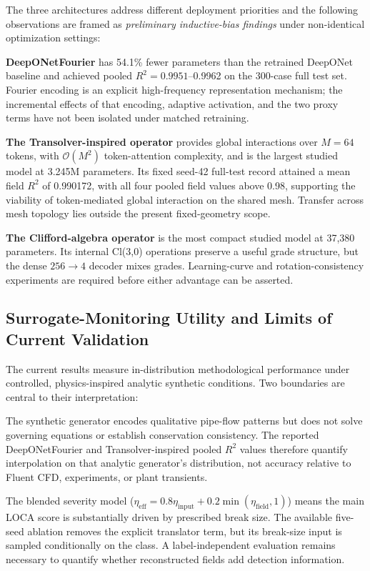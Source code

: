 \documentclass[journal]{IEEEtran}
\newcommand{\added}[1]{#1}
\begin{document}
The three architectures address different deployment priorities and the following observations are framed as \emph{preliminary inductive-bias findings} under non-identical optimization settings:

\added{\textbf{DeepONetFourier} has 54.1\% fewer parameters than the retrained DeepONet baseline and achieved pooled $R^2=0.9951$--0.9962 on the 300-case full test set. Fourier encoding is an explicit high-frequency representation mechanism; the incremental effects of that encoding, adaptive activation, and the two proxy terms have not been isolated under matched retraining.}

\added{\textbf{The Transolver-inspired operator} provides global interactions over $M=64$ tokens, with $\mathcal{O}(M^2)$ token-attention complexity, and is the largest studied model at 3.245M parameters. Its fixed seed-42 full-test record attained a mean field $R^2$ of 0.990172, with all four pooled field values above 0.98, supporting the viability of token-mediated global interaction on the shared mesh. Transfer across mesh topology lies outside the present fixed-geometry scope.}

\added{\textbf{The Clifford-algebra operator} is the most compact studied model at 37,380 parameters. Its internal Cl(3,0) operations preserve a useful grade structure, but the dense $256\to4$ decoder mixes grades. Learning-curve and rotation-consistency experiments are required before either advantage can be asserted.}

\subsection{Surrogate-Monitoring Utility and Limits of Current Validation}

\added{The current results measure in-distribution methodological performance under controlled, physics-inspired analytic synthetic conditions. Two boundaries are central to their interpretation:}

\added{The synthetic generator encodes qualitative pipe-flow patterns but does not solve governing equations or establish conservation consistency. The reported DeepONetFourier and Transolver-inspired pooled $R^2$ values therefore quantify interpolation on that analytic generator's distribution, not accuracy relative to Fluent CFD, experiments, or plant transients.}

\added{The blended severity model ($\eta_\text{eff}=0.8\eta_\text{input}+0.2\min(\eta_\text{field},1)$) means the main LOCA score is substantially driven by prescribed break size. The available five-seed ablation removes the explicit translator term, but its break-size input is sampled conditionally on the class. A label-independent evaluation remains necessary to quantify whether reconstructed fields add detection information.}
\end{document}
